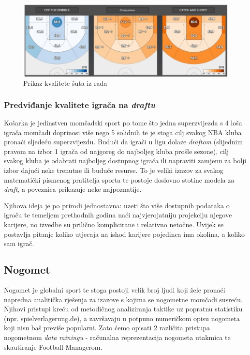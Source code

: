 \documentclass{ferseminar}
\begin{document}
\begin{figure}[htb]
	\centering
	\includegraphics[]{img/shots.jpg}
	\caption{Prikaz kvalitete šuta iz rada \cite{NBAshots}}
	\label{fig:shots}
\end{figure}

\subsubsection{Predviđanje kvalitete igrača na \textit{draftu}}
Košarka je jedinstven momčadski sport po tome što jedna superzvijezda s 4 loša igrača momčadi doprinosi više nego 5 solidnih te je stoga cilj svakog NBA kluba pronaći sljedeću superzvijezdu. Budući da igrači u ligu dolaze \textit{draftom} (slijednim pravom na izbor 1 igrača od najgoreg do najboljeg kluba prošle sezone), cilj svakog kluba je odabrati najboljeg dostupnog igrača ili napraviti zamjenu za bolji izbor dajući neke trenutne ili buduće resurse. To je veliki izazov za svakog matematički pismenog pratitelja sporta te postoje doslovno stotine modela za \textit{draft}, a poveznica prikazuje neke najpoznatije. \cite{models}

Njihova ideja je po prirodi jednostavna: uzeti što više dostupnih podataka o igraču te temeljem prethodnih godina naći najvjerojatniju projekciju njegove karijere, no izvedbe su prilično komplicirane i relativno netočne. Uvijek se postavlja pitanje koliko utjecaja na ishod karijere pojedinca ima okolina, a koliko sam igrač.

\subsection{Nogomet}

Nogomet je globalni sport te stoga postoji velik broj ljudi koji žele pronaći napredna analitička rješenja za izazove s kojima se nogometne momčadi susreću. Njihovi pristupi kreću od metodičnog analiziranja taktike uz popratnu statistiku (npr. spielverlagerung.de), a završavaju u potpuno numeričkom opisu nogometa koji nisu baš previše popularni. \cite{soccAn} Zato ćemo opisati 2 različita pristupa nogometnom \textit{data miningu} - računalna reprezentacija nogometa utakmica te skautiranje Football Managerom.
\end{document}
